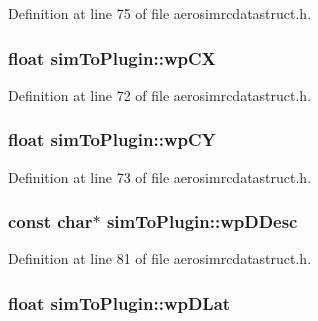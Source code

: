 \-Definition at line 75 of file aerosimrcdatastruct.\-h.

\hypertarget{group___aero_sim_r_c_ga0a8e805aa99027c87923b25db32173ab}{
\subsubsection[{wp\-C\-X}]{\setlength{\rightskip}{0pt plus 5cm}float {\bf sim\-To\-Plugin\-::wp\-C\-X}}}\label{group___aero_sim_r_c_ga0a8e805aa99027c87923b25db32173ab}


\-Definition at line 72 of file aerosimrcdatastruct.\-h.

\hypertarget{group___aero_sim_r_c_ga3dd39df83926569f9d180ced28377a4f}{
\subsubsection[{wp\-C\-Y}]{\setlength{\rightskip}{0pt plus 5cm}float {\bf sim\-To\-Plugin\-::wp\-C\-Y}}}\label{group___aero_sim_r_c_ga3dd39df83926569f9d180ced28377a4f}


\-Definition at line 73 of file aerosimrcdatastruct.\-h.

\hypertarget{group___aero_sim_r_c_ga65acd288880e17514c40557035b74fe3}{
\subsubsection[{wp\-D\-Desc}]{\setlength{\rightskip}{0pt plus 5cm}const char$\ast$ {\bf sim\-To\-Plugin\-::wp\-D\-Desc}}}\label{group___aero_sim_r_c_ga65acd288880e17514c40557035b74fe3}


\-Definition at line 81 of file aerosimrcdatastruct.\-h.

\hypertarget{group___aero_sim_r_c_ga39ee4024f6f29cf4c19531ccf9f8122a}{
\subsubsection[{wp\-D\-Lat}]{\setlength{\rightskip}{0pt plus 5cm}float {\bf sim\-To\-Plugin\-::wp\-D\-Lat}}}\label{group___aero_sim_r_c_ga39ee4024f6f29cf4c19531ccf9f8122a}


